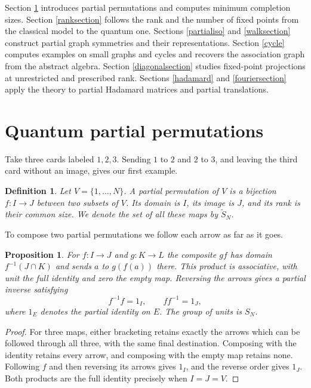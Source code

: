 \documentclass[11pt,a4paper]{article}
\newtheorem{prop}[thm]{Proposition}
\newtheorem{defn}[thm]{Definition}
\begin{document}
Section \ref{prelim} introduces partial permutations and computes minimum completion sizes. Section \ref{ranksection} follows the rank and the number of fixed points from the classical model to the quantum one. Sections \ref{partialiso} and \ref{walksection} construct partial graph symmetries and their representations. Section \ref{cycle} computes examples on small graphs and cycles and recovers the association graph from the abstract algebra. Section \ref{diagonalsection} studies fixed-point projections at unrestricted and prescribed rank. Sections \ref{hadamard} and \ref{fouriersection} apply the theory to partial Hadamard matrices and partial translations.

\section{Quantum partial permutations}\label{prelim}

Take three cards labeled $1,2,3$. Sending $1$ to $2$ and $2$ to $3$, and leaving the third card without an image, gives our first example.

\begin{defn}
Let $V=\{1,\ldots,N\}$. A partial permutation of $V$ is a bijection $f:I\to J$ between two subsets of $V$. Its domain is $I$, its image is $J$, and its rank is their common size. We denote the set of all these maps by $\widetilde S_N$.
\end{defn}

To compose two partial permutations we follow each arrow as far as it goes.

\begin{prop}\label{inverse}
For $f:I\to J$ and $g:K\to L$ the composite $gf$ has domain $f^{-1}(J\cap K)$ and sends $a$ to $g(f(a))$ there. This product is associative, with unit the full identity and zero the empty map. Reversing the arrows gives a partial inverse satisfying
\[
 f^{-1}f=1_I,\qquad ff^{-1}=1_J ,
\]
where $1_E$ denotes the partial identity on $E$. The group of units is $S_N$.
\end{prop}
\begin{proof}
For three maps, either bracketing retains exactly the arrows which can be followed through all three, with the same final destination. Composing with the identity retains every arrow, and composing with the empty map retains none. Following $f$ and then reversing its arrows gives $1_I$, and the reverse order gives $1_J$. Both products are the full identity precisely when $I=J=V$.
\end{proof}
\end{document}
